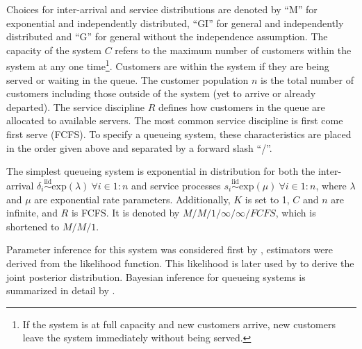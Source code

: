 \documentclass[article]{jss}
\begin{document}
Choices for inter-arrival and service distributions are denoted by
``M'' for exponential and independently distributed, ``GI'' for general
and independently distributed and ``G'' for general without the
independence assumption. The capacity of the system $C$ refers to the
maximum number of customers within the system at any one
time\footnote{If the system is at full capacity and new customers
  arrive, new customers leave the system immediately without being
  served.}. Customers are within the system if they are being served
or waiting in the queue. The customer population $n$ is the total
number of customers including those outside of the system (yet to
arrive or already departed). The service discipline $R$ defines how
customers in the queue are allocated to available servers. The most
common service discipline is first come first serve (FCFS). To specify
a queueing system, these characteristics are placed in the order given
above and separated by a forward slash ``/''.

The simplest queueing system is exponential in distribution for both
the inter-arrival
$\delta_i \overset{\text{iid}}{\sim} \mathrm{exp}(\lambda) ~ \forall i \in
1:n$ and service processes
$s_i \overset{\text{iid}}{\sim} \mathrm{exp}(\mu) ~ \forall i \in 1:n$, where
$\lambda$ and $\mu$ are exponential rate parameters. Additionally, $K$
is set to 1, $C$ and $n$ are infinite, and $R$ is FCFS. It is denoted
by $M/M/1/ \infty / \infty / \mathit{FCFS}$, which is shortened to $M/M/1$.

Parameter inference for this system was considered first by
\citet{clarke1957maximum}, estimators were derived from the likelihood
function. This likelihood is later used by
\citet{muddapur1972bayesian} to derive the joint posterior
distribution. Bayesian inference for queueing systems is summarized in
detail by \citet{insua2012bayesian}.
\end{document}
